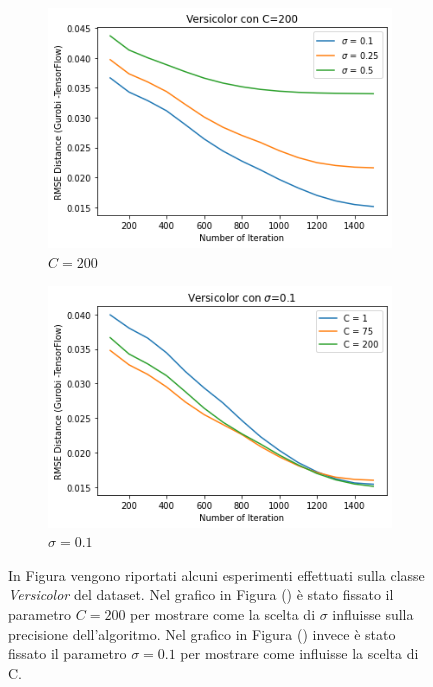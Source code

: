 \documentclass[a4paper,12pt]{report}
\begin{document}
\begin{figure}[H]
    \begin{subfigure}{0.47\textwidth}
        \centering
        \includegraphics[scale=0.5]{images/Grafici/Versicolor_C200_sigmaDiversi.png}
        \caption{$C=200$}
        \label{subfig:Versicolor_C200_sigmaDiversi}
    \end{subfigure}
    \begin{subfigure}{0.47\textwidth}
        \centering
        \includegraphics[scale=0.5]{images/Grafici/Versicolor_Cdiversi_sigma01.png}
        \caption{$\sigma=0.1$}
        \label{subfig:Versicolor_Cdiversi_sigma01}
    \end{subfigure}
    \caption{In Figura vengono riportati alcuni esperimenti effettuati sulla classe \textit{Versicolor} del dataset. Nel grafico in Figura () è stato fissato il parametro $C=200$ per mostrare come la scelta di $\sigma$ influisse sulla precisione dell'algoritmo. Nel grafico in Figura () invece è stato fissato il parametro $\sigma = 0.1$ per mostrare come influisse la scelta di C.}
    \label{fig:Versicolor_Preliminari}
\end{figure}
\end{document}
